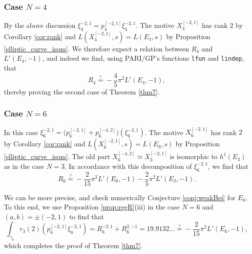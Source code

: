 \documentclass[11pt,a4,leqno]{amsart}
\theoremstyle{my theoremstyle}
\theoremstyle{dfn}
\theoremstyle{remark}
\renewcommand{\1}{\mathbbm{1}}
\numberwithin{equation}{section}
\begin{document}
\subsubsection{Case $N=4$}

By the above discussion $\xi_4^{-2,1} = p_4^{[-2,1]} \xi_4^{-2,1}$. The motive $X_4^{[-2,1]}$ has rank $2$ by Corollary \ref{cor:rank} and $L(X_4^{[-2,1]},s)=L(E_4, s)$ by Proposition \ref{elliptic_curve_isom}. We therefore expect a relation between $R_4$ and $L'(E_{4}, -1)$, and indeed we find, using PARI/GP's functions \texttt{lfun} and \texttt{lindep}, that
\begin{equation*}
    R_4 \stackrel{?}{=} -\frac45 \pi^2 L'(E_{4},-1),
\end{equation*}
thereby proving the second case of Theorem \ref{thm7}.

\subsubsection{Case $N=6$}

In this case $\xi_6^{-2,1} = \bigl(p_6^{[-2,1]} + p_6^{[-4,2]}\bigr)(\xi_6^{-2,1})$. The motive $X_6^{[-2,1]}$ has rank $2$ by Corollary \ref{cor:rank} and $L(X_6^{[-2,1]},s)=L(E_6, s)$ by Proposition \ref{elliptic_curve_isom}. The old part $X_6^{[-4,2]} \simeq X_3^{[-2,1]}$ is isomorphic to $h^1(E_{3})$ as in the case $N=3$. In accordance with this decomposition of $\xi_6^{-2,1}$, we find that
\begin{equation*}
    R_6 \stackrel{?}{=} -\frac2{15} \pi^2 L'(E_{6},-1) - \frac25 \pi^2 L'(E_{3},-1).
\end{equation*}

We can be more precise, and check numerically Conjecture \ref{conj:weakBei} for $E_{6}$. 
To this end, we use Proposition \ref{prop:regR}(iii) in the case $N = 6$ and $(a,b)= \pm (-2,1)$ to find that
\begin{equation*}
    \int_{\gamma_6} r_3(2)(p_6^{[-2,1]} \xi_6^{-2,1}) = R_6^{-2,1} + R_6^{2,-1} = 19.9132\dots \stackrel{?}{=} - \frac2{15} \pi^2 L'(E_{6},-1),
\end{equation*}
which completes the proof of Theorem \ref{thm7}. 
\end{document}

